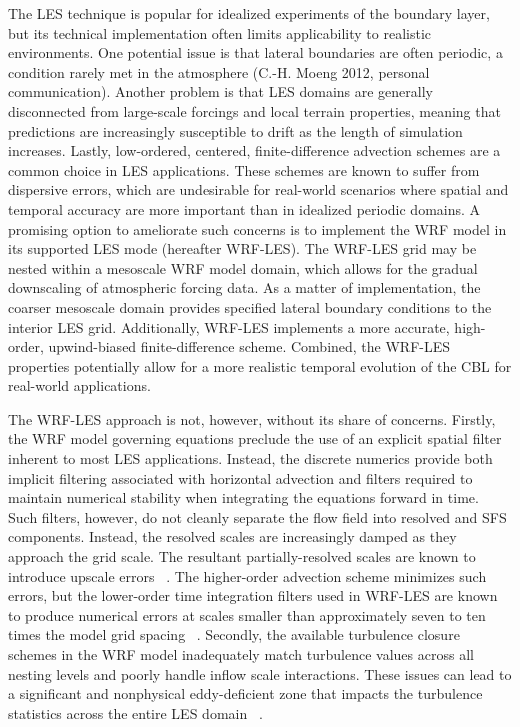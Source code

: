 The LES technique is popular for idealized experiments of the boundary layer, but its technical implementation often limits applicability to realistic environments. One potential issue is that lateral boundaries are often periodic, a condition rarely met in the atmosphere (C.-H. Moeng 2012, personal communication). Another problem is that LES domains are generally disconnected from large-scale forcings and local terrain properties, meaning that predictions are increasingly susceptible to drift as the length of simulation increases. Lastly, low-ordered, centered, finite-difference advection schemes are a common choice in LES applications. These schemes are known to suffer from dispersive errors, which are undesirable for real-world scenarios where spatial and temporal accuracy are more important than in idealized periodic domains. A promising option to ameliorate such concerns is to implement the WRF model in its supported LES mode (hereafter WRF-LES). The WRF-LES grid may be nested within a mesoscale WRF model domain, which allows for the gradual downscaling of atmospheric forcing data. As a matter of implementation, the coarser mesoscale domain provides specified lateral boundary conditions to the interior LES grid. Additionally, WRF-LES implements a more accurate, high-order, upwind-biased finite-difference scheme. Combined, the WRF-LES properties potentially allow for a more realistic temporal evolution of the CBL for real-world applications.

The WRF-LES approach is not, however, without its share of concerns. Firstly, the WRF model governing equations preclude the use of an explicit spatial filter inherent to most LES applications. Instead, the discrete numerics provide both implicit filtering associated with horizontal advection and filters required to maintain numerical stability when integrating the equations forward in time. Such filters, however, do not cleanly separate the flow field into resolved and SFS components. Instead, the resolved scales are increasingly damped as they approach the grid scale. The resultant partially-resolved scales are known to introduce upscale errors ~\citep{Chow2005}. The higher-order advection scheme minimizes such errors, but the lower-order time integration filters used in WRF-LES are known to produce numerical errors at scales smaller than approximately seven to ten times the model grid spacing ~\citep{Skamarock04, Mirocha2010}. Secondly, the available turbulence closure schemes in the WRF model inadequately match turbulence values across all nesting levels and poorly handle inflow scale interactions. These issues can lead to a significant and nonphysical eddy-deficient zone that impacts the turbulence statistics across the entire LES domain ~\citep{Moeng07, Gaudet2012}.

